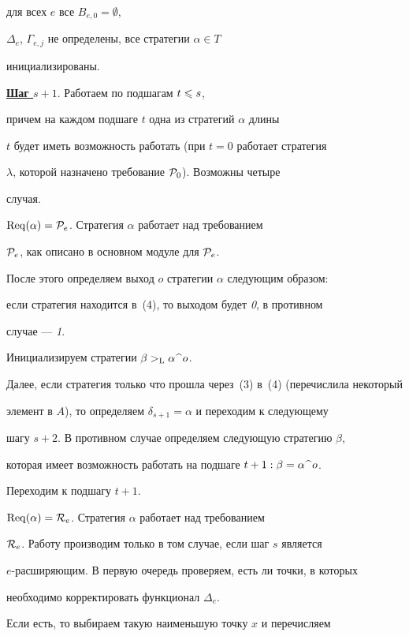 для всех $e$ все $B_{e,0}=\emptyset$,


$\Delta_e$, $\Gamma_{e,j}$ не определены, все стратегии $\alpha\in T$


инициализированы.





\noindent\underline{\bf Шаг $s+1$}. Работаем по подшагам $t\leqslant s$,


причем на каждом подшаге $t$ одна из стратегий $\alpha$ длины


$t$ будет иметь возможность работать (при $t=0$ работает стратегия


$\lambda$, которой назначено требование ${\cal P}_0$). Возможны четыре


случая.


 


$\operatorname{Req}(\alpha)={\cal P}_e$. Стратегия $\alpha$ работает над требованием


${\cal P}_e$, как описано в основном модуле для ${\cal P}_e$.


После этого определяем выход  $o$ стратегии $\alpha$ следующим образом:


если стратегия находится в~(4), то выходом будет {\it 0}, в противном


случае --- {\it 1}.


Инициализируем стратегии $\beta>_{\mathrm L}\alpha\,\widehat{\ }\,o$.


Далее, если стратегия только что прошла через~(3) в~(4) (перечислила некоторый


элемент в $A$), то определяем $\delta_{s+1}=\alpha$ и переходим к следующему


шагу $s+2$. В противном случае определяем следующую стратегию $\beta$,


которая имеет возможность работать на подшаге $t+1 : \beta=\alpha\,\widehat{\ }\,o$.


Переходим к подшагу $t+1$.





$\operatorname{Req}(\alpha)={\cal R}_e$. Стратегия $\alpha$ работает над требованием


${\cal R}_e$. Работу производим только в том случае, если шаг $s$ является


$e$-расширяющим. В первую очередь проверяем, есть ли точки, в которых


необходимо корректировать функционал $\Delta_e$.


Если есть, то выбираем такую наименьшую точку $x$ и перечисляем



